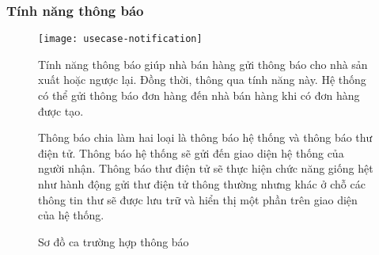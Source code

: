 \subsubsection{Tính năng thông báo}
\begin{figure}[hbt!]\fontsize{13px}{13px}\selectfont
\centering
		\texttt{[image: usecase-notification]}
		\caption{Sơ đồ ca trường hợp thông báo}
\justifying
Tính năng thông báo giúp nhà bán hàng gửi thông báo cho nhà sản xuất hoặc ngược lại. Đồng thời, thông qua tính năng này. Hệ thống có thể gửi thông báo đơn hàng đến nhà bán hàng khi có đơn hàng được tạo.

Thông báo chia làm hai loại là thông báo hệ thống và thông báo thư điện tử. Thông báo hệ thống sẽ gửi đến giao diện hệ thống của người nhận. Thông báo thư điện tử sẽ thực hiện chức năng giống hệt như hành động gửi thư điện tử thông thường nhưng khác ở chỗ các thông tin thư sẽ được lưu trữ và hiển thị một phần trên giao diện của hệ thống.
\end{figure}